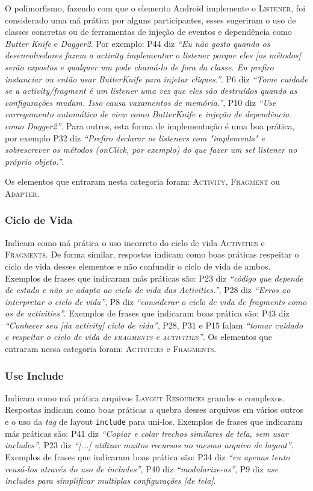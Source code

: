 O polimorfismo, fazendo com que o elemento Android implemente o \textsc{Listener}, foi considerado uma má prática por alguns participantes, esses sugeriram o uso de classes concretas ou de ferramentas de injeção de eventos e dependência como \textit{Butter Knife} \cite{ButterKnife} e \textit{Dagger2}. Por exemplo: P44 diz \textit{``Eu não gosto quando os desenvolvedores fazem a activity implementar o listener porque eles [os métodos] serão expostos e qualquer um pode chamá-lo de fora da classe. Eu prefiro instanciar ou então usar ButterKnife para injetar cliques.''}. P6 diz \textit{``Tome cuidade se a activity/fragment é um listener uma vez que eles são destruídos quando as configurações mudam. Isso causa vazamentos de memória.''}, P10 diz \textit{``Use carregamento automático de view como ButterKnife e injeção de dependência como Dagger2''}. Para outros, esta forma de implementação é uma boa prática, por exemplo P32 diz \textit{``Prefiro declarar os listeners com "implements" e sobrescrever os métodos (onClick, por exemplo) do que fazer um set listener no próprio objeto.''}.

Os elementos que entraram nesta categoria foram: \textsc{Activity}, \textsc{Fragment} ou \textsc{Adapter}.

\subsubsection{Ciclo de Vida}
Indicam como má prática o uso incorreto do ciclo de vida \textsc{Activities} e \textsc{Fragments}. De forma similar, respostas indicam como boas práticas respeitar o ciclo de vida desses elementos e não confundir o ciclo de vida de ambos. Exemplos de frases que indicaram más práticas são: P23 diz \textit{``código que depende de estado e não se adapta ao ciclo de vida das Activities.''}, P28 diz \textit{``Erros ao interpretar o ciclo de vida''}, P8 diz \textit{``considerar o ciclo de vida de fragments como os de activities''}. Exemplos de frases que indicaram boas prática são: P43 diz \textit{``Conhecer seu [da activity] ciclo de vida''}, P28, P31 e P15 falam \textit{``tomar cuidado e respeitar o ciclo de vida de \textsc{fragments} e \textsc{activities}''}. Os elementos que entraram nessa categoria foram: \textsc{Activities} e \textsc{Fragments}. 

\subsubsection{Use Include}
Indicam como má prática arquivos \textsc{Layout Resources} grandes e complexos. Respostas indicam como boas práticas a quebra desses arquivos em vários outros e o uso da \textit{tag} de layout \texttt{include} para uni-los. Exemplos de frases que indicaram más práticas são: P41 diz \textit{``Copiar e colar trechos similares de tela, sem usar includes''}, P23 diz \textit{``[...] utilizar muitos recursos no mesmo arquivo de layout''}. Exemplos de frases que indicaram boas prática são: P34 diz \textit{``eu apenas tento reusá-los através do uso de includes''}, P40 diz \textit{``modularize-os''}, P9 diz \textit{use includes para simplificar multiplas configurações [de tela]}. 

